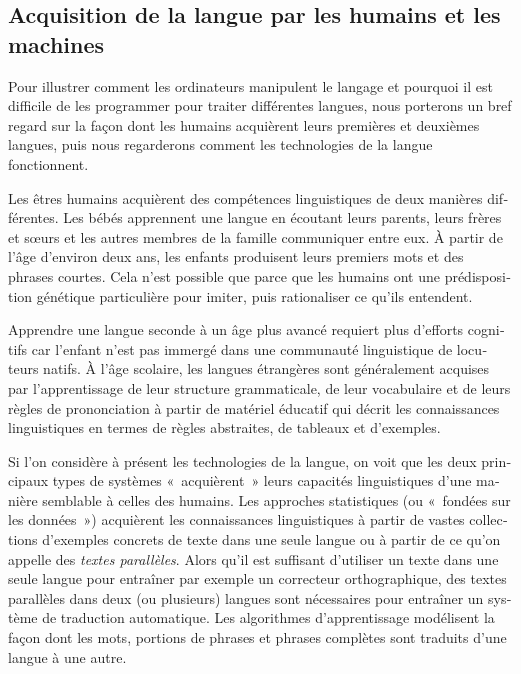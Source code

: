 \begin{french}
\begin{multicols}{2}

\subsection{Acquisition de la langue par les humains et les machines}

Pour illustrer comment les ordinateurs manipulent le langage et pourquoi
il est difficile de les programmer pour traiter différentes langues,
nous porterons un bref regard sur la façon dont les humains acquièrent
leurs premières et deuxièmes langues, puis nous regarderons comment
les technologies de la langue fonctionnent.

Les êtres humains acquièrent des compétences linguistiques de deux
manières différentes. Les bébés apprennent une langue en écoutant
leurs parents, leurs frères et sœurs et les autres membres de la
famille communiquer entre eux. À partir de l'âge d'environ deux ans, les enfants produisent leurs premiers mots et
des phrases courtes. Cela n'est possible que parce que les
humains ont une prédisposition génétique particulière pour imiter,
puis rationaliser ce qu'ils entendent.

Apprendre une langue seconde à un âge plus avancé requiert plus
d'efforts cognitifs car l'enfant n'est pas
immergé dans une communauté linguistique de locuteurs natifs. À
l'âge scolaire, les langues étrangères sont généralement
acquises par l'apprentissage de leur structure grammaticale,
de leur vocabulaire et de leurs règles de prononciation à partir de
matériel éducatif qui décrit les connaissances linguistiques en termes
de règles abstraites, de tableaux et d'exemples.
\vspace{0.25in}

Si l'on considère à présent les technologies de la langue, on
voit que les deux principaux types de systèmes «~acquièrent~» leurs
capacités linguistiques d'une manière semblable à celles des
humains. Les approches statistiques (ou «~fondées sur les données~»)
acquièrent les connaissances linguistiques à partir de vastes
collections d'exemples concrets de texte dans une seule langue
ou à partir de ce qu'on appelle des {\em textes
  parallèles}. Alors qu'il est suffisant d'utiliser un
texte dans une seule langue pour entraîner par exemple un correcteur
orthographique, des textes parallèles dans deux (ou plusieurs) langues
sont nécessaires pour entraîner un système de traduction
automatique. Les algorithmes d'apprentissage modélisent la
façon dont les mots, portions de phrases et phrases complètes sont
traduits d'une langue à une autre.


\end{multicols}
\end{french}
